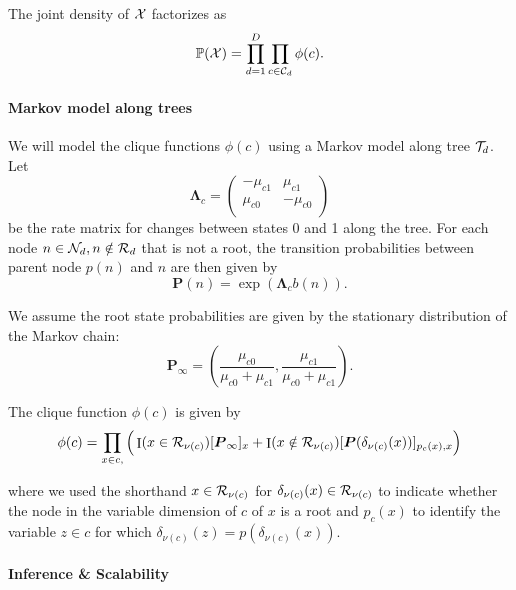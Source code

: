 \documentclass[
11pt, %
oneside, %
english, %
singlespacing, %
headsepline, %
chapterinoneline, %
]{MastersDoctoralThesis} %
\DeclareMathOperator{\Ind}{I}
\def\P{\mathbb{P}}
\def\bLambda{\boldsymbol{\Lambda}}
\def\bP{\boldsymbol{P}}
\def\C{{\cal C}}
\def\N{{\cal N}}
\def\R{{\cal R}}
\def\T{{\cal T}}
\def\X{{\cal X}}
\begin{document}
The joint density of $\X$ factorizes as
\begin{equation}
	\P(\X) = \prod_{d=1}^D \prod_{c \in \C_d} \phi(c).
\end{equation}

\paragraph{Markov model along trees} We will model the clique functions $\phi(c)$ using a Markov model along tree $\T_d$. Let
\begin{equation}
	\bLambda_c =
	\begin{pmatrix}
		-\mu_{c1} & \mu_{c1}\\
		\mu_{c0} & -\mu_{c0}\\
	\end{pmatrix}
\end{equation}
be the rate matrix for changes between states 0 and 1 along the tree. For each node $n \in \N_d, n \notin \R_d$ that is not a root, the transition probabilities between parent node $p(n)$ and $n$ are then given by
\begin{equation}
	\bP(n) = \exp(\bLambda_c b(n)).
\end{equation}

We assume the root state probabilities are given by the stationary distribution of the Markov chain:
\begin{equation}
	\bP_{\infty} = \left(\frac{\mu_{c0}}{\mu_{c0} + \mu_{c1}}, \frac{\mu_{c1}}{\mu_{c0} + \mu_{c1}}\right).
\end{equation}


The clique function $\phi(c)$ is given by
\begin{equation}
	\phi(c) = \prod_{x \in c, }\Big( \Ind(x \in \R_{\nu(c)})[\bP_{\infty}]_x\\
	+ \Ind(x \notin \R_{\nu(c)}) [\bP(\delta_{\nu(c)}(x))]_{p_{c}(x), x} \Big)
\end{equation}

where we used the shorthand $x \in \R_{\nu(c)}$ for $\delta_{\nu(c)}(x) \in \R_{\nu(c)}$ to indicate whether the node in the variable dimension of $c$ of $x$ is a root and $p_{c}(x)$ to identify the variable $z \in c$ for which $\delta_{\nu(c)}(z) = p(\delta_{\nu(c)}(x))$.


\paragraph{Inference \& Scalability}
\end{document}
